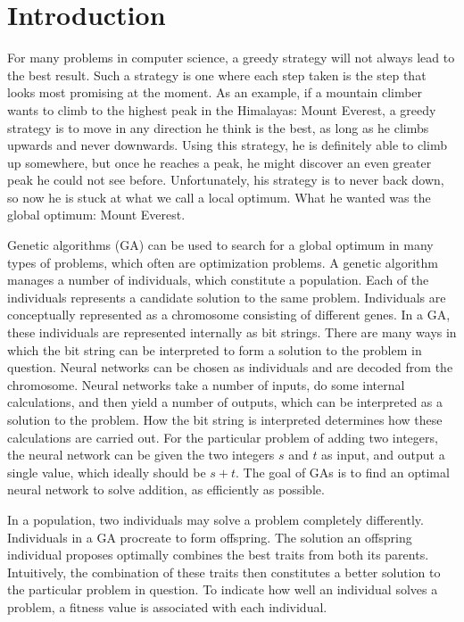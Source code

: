\section{Introduction}
For many problems in computer science, a greedy strategy will not always lead to the best result. Such a strategy is one where each step taken is the step that looks most promising at the moment. As an example, if a mountain climber wants to climb to the highest peak in the Himalayas: Mount Everest, a greedy strategy is to move in any direction he think is the best, as long as he climbs upwards and never downwards. Using this strategy, he is definitely able to climb up somewhere, but once he reaches a peak, he might discover an even greater peak he could not see before. Unfortunately, his strategy is to never back down, so now he is stuck at what we call a local optimum. What he wanted was the global optimum: Mount Everest.
 
Genetic algorithms (GA) can be used to search for a global optimum in many types of problems, which often are optimization problems. A genetic algorithm manages a number of individuals, which constitute a population. Each of the individuals represents a candidate solution to the same problem. Individuals are conceptually represented as a chromosome consisting of different genes. In a GA, these individuals are represented internally as bit strings. There are many ways in which the bit string can be interpreted to form a solution to the problem in question. Neural networks can be chosen as individuals and are decoded from the chromosome. Neural networks take a number of inputs, do some internal calculations, and then yield a number of outputs, which can be interpreted as a solution to the problem. How the bit string is interpreted determines how these calculations are carried out. For the particular problem of adding two integers, the neural network can be given the two integers $s$ and $t$ as input, and output a single value, which ideally should be $s+t$. The goal of GAs is to find an optimal neural network to solve addition, as efficiently as possible.

In a population, two individuals may solve a problem completely differently. Individuals in a GA procreate to form offspring. The solution an offspring individual proposes optimally combines the best traits from both its parents. Intuitively, the combination of these traits then constitutes a better solution to the particular problem in question. To indicate how well an individual solves a problem, a fitness value is associated with each individual.

